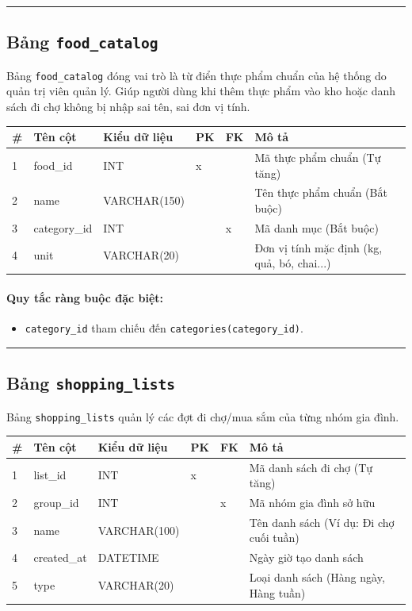 \documentclass[12pt,a4paper]{article}
\begin{document}
\vskip 0.5cm
\noindent\rule{\textwidth}{0.5pt}
\vskip 0.5cm

\subsection{Bảng \texttt{food\_catalog}}
Bảng \texttt{food\_catalog} đóng vai trò là từ điển thực phẩm chuẩn của hệ thống do quản trị viên quản lý. Giúp người dùng khi thêm thực phẩm vào kho hoặc danh sách đi chợ không bị nhập sai tên, sai đơn vị tính.

\begin{longtable}{|p{0.5cm}|p{3.4cm}|p{3.2cm}|p{0.7cm}|p{0.7cm}|p{3.6cm}|}
\hline
\textbf{\#} & \textbf{Tên cột} & \textbf{Kiểu dữ liệu} & \textbf{PK} & \textbf{FK} & \textbf{Mô tả} \\ \hline
\endhead
1 & food\_id & INT & x & & Mã thực phẩm chuẩn (Tự tăng) \\ \hline
2 & name & VARCHAR(150) & & & Tên thực phẩm chuẩn (Bắt buộc) \\ \hline
3 & category\_id & INT & & x & Mã danh mục (Bắt buộc) \\ \hline
4 & unit & VARCHAR(20) & & & Đơn vị tính mặc định (kg, quả, bó, chai...) \\ \hline
\end{longtable}

\paragraph{Quy tắc ràng buộc đặc biệt:}
\begin{itemize}
    \item \texttt{category\_id} tham chiếu đến \texttt{categories(category\_id)}.
\end{itemize}

\vskip 0.5cm
\noindent\rule{\textwidth}{0.5pt}
\vskip 0.5cm

\subsection{Bảng \texttt{shopping\_}\allowbreak\texttt{lists}}
Bảng \texttt{shopping\_}\allowbreak\texttt{lists} quản lý các đợt đi chợ/mua sắm của từng nhóm gia đình.

\begin{longtable}{|p{0.5cm}|p{3.4cm}|p{3.2cm}|p{0.7cm}|p{0.7cm}|p{3.6cm}|}
\hline
\textbf{\#} & \textbf{Tên cột} & \textbf{Kiểu dữ liệu} & \textbf{PK} & \textbf{FK} & \textbf{Mô tả} \\ \hline
\endhead
1 & list\_id & INT & x & & Mã danh sách đi chợ (Tự tăng) \\ \hline
2 & group\_id & INT & & x & Mã nhóm gia đình sở hữu \\ \hline
3 & name & VARCHAR(100) & & & Tên danh sách (Ví dụ: Đi chợ cuối tuần) \\ \hline
4 & created\_at & DATETIME & & & Ngày giờ tạo danh sách \\ \hline
5 & type & VARCHAR(20) & & & Loại danh sách (Hàng ngày, Hàng tuần) \\ \hline
\end{longtable}
\end{document}
